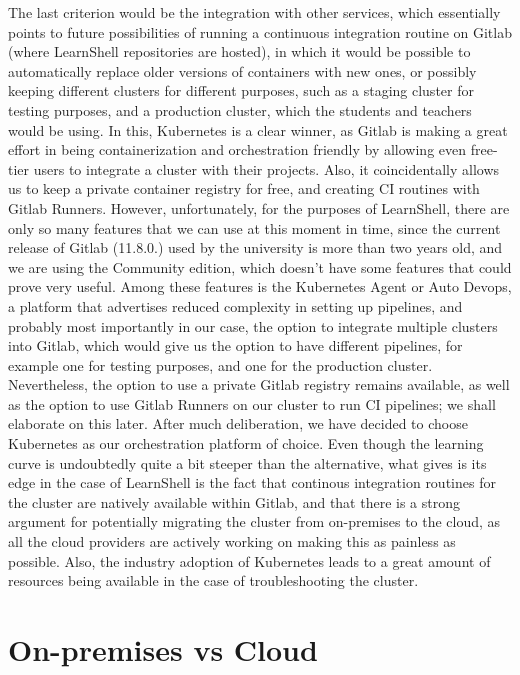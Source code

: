 \documentclass[thesis=B,english]{FITthesis}[2019/12/23]
\begin{document}
\newline
The last criterion would be the integration with other services, which essentially points to future possibilities of running a continuous integration routine on Gitlab (where LearnShell repositories are hosted), in which it would be possible to automatically replace older versions of containers with new ones, or possibly keeping different clusters for different purposes, such as a staging cluster for testing purposes, and a production cluster, which the students and teachers would be using. In this, Kubernetes is a clear winner, as Gitlab is making a great effort in being containerization and orchestration friendly by allowing even free-tier users to integrate a cluster with their projects. \cite{gitlab-kube} Also, it coincidentally allows us to keep a private container registry for free, and creating CI routines with Gitlab Runners. However, unfortunately, for the purposes of LearnShell, there are only so many features that we can use at this moment in time, since the current release of Gitlab (11.8.0.) used by the university is more than two years old, and we are using the Community edition, which doesn't have some features that could prove very useful. Among these features is the Kubernetes Agent or Auto Devops, a platform that advertises reduced complexity in setting up pipelines, and probably most importantly in our case, the option to integrate multiple clusters into Gitlab, which would give us the option to have different pipelines, for example one for testing purposes, and one for the production cluster. Nevertheless, the option to use a private Gitlab registry remains available, as well as the option to use Gitlab Runners on our cluster to run CI pipelines; we shall elaborate on this later.
\newline
After much deliberation, we have decided to choose Kubernetes as our orchestration platform of choice. Even though the learning curve is undoubtedly quite a bit steeper than the alternative, what gives is its edge in the case of LearnShell is the fact that continous integration routines for the cluster are natively available within Gitlab, and that there is a strong argument for potentially migrating the cluster from on-premises to the cloud, as all the cloud providers are actively working on making this as painless as possible. Also, the industry adoption of Kubernetes leads to a great amount of resources being available in the case of troubleshooting the cluster.

\section{On-premises vs Cloud}
\end{document}
